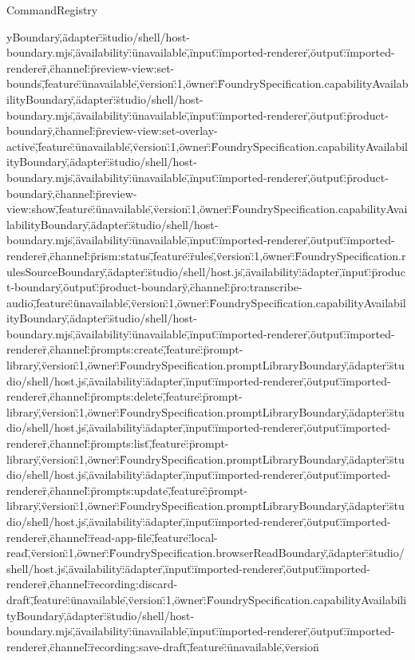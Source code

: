 \begin{lexlean}{CommandRegistry}
\begin{semanticmodule}
{yBoundary\",\"adapter\":\"studio/shell/host-boundary.mjs\",\"availability\":\"unavailable\",\"input\":\"imported-renderer\",\"output\":\"imported-renderer\"},{\"channel\":\"preview-view:set-bounds\",\"feature\":\"unavailable\",\"version\":1,\"owner\":\"FoundrySpecification.capabilityAvailabilityBoundary\",\"adapter\":\"studio/shell/host-boundary.mjs\",\"availability\":\"unavailable\",\"input\":\"imported-renderer\",\"output\":\"product-boundary\"},{\"channel\":\"preview-view:set-overlay-active\",\"feature\":\"unavailable\",\"version\":1,\"owner\":\"FoundrySpecification.capabilityAvailabilityBoundary\",\"adapter\":\"studio/shell/host-boundary.mjs\",\"availability\":\"unavailable\",\"input\":\"imported-renderer\",\"output\":\"product-boundary\"},{\"channel\":\"preview-view:show\",\"feature\":\"unavailable\",\"version\":1,\"owner\":\"FoundrySpecification.capabilityAvailabilityBoundary\",\"adapter\":\"studio/shell/host-boundary.mjs\",\"availability\":\"unavailable\",\"input\":\"imported-renderer\",\"output\":\"imported-renderer\"},{\"channel\":\"prism:status\",\"feature\":\"rules\",\"version\":1,\"owner\":\"FoundrySpecification.rulesSourceBoundary\",\"adapter\":\"studio/shell/host.js\",\"availability\":\"adapter\",\"input\":\"product-boundary\",\"output\":\"product-boundary\"},{\"channel\":\"pro:transcribe-audio\",\"feature\":\"unavailable\",\"version\":1,\"owner\":\"FoundrySpecification.capabilityAvailabilityBoundary\",\"adapter\":\"studio/shell/host-boundary.mjs\",\"availability\":\"unavailable\",\"input\":\"imported-renderer\",\"output\":\"imported-renderer\"},{\"channel\":\"prompts:create\",\"feature\":\"prompt-library\",\"version\":1,\"owner\":\"FoundrySpecification.promptLibraryBoundary\",\"adapter\":\"studio/shell/host.js\",\"availability\":\"adapter\",\"input\":\"imported-renderer\",\"output\":\"imported-renderer\"},{\"channel\":\"prompts:delete\",\"feature\":\"prompt-library\",\"version\":1,\"owner\":\"FoundrySpecification.promptLibraryBoundary\",\"adapter\":\"studio/shell/host.js\",\"availability\":\"adapter\",\"input\":\"imported-renderer\",\"output\":\"imported-renderer\"},{\"channel\":\"prompts:list\",\"feature\":\"prompt-library\",\"version\":1,\"owner\":\"FoundrySpecification.promptLibraryBoundary\",\"adapter\":\"studio/shell/host.js\",\"availability\":\"adapter\",\"input\":\"imported-renderer\",\"output\":\"imported-renderer\"},{\"channel\":\"prompts:update\",\"feature\":\"prompt-library\",\"version\":1,\"owner\":\"FoundrySpecification.promptLibraryBoundary\",\"adapter\":\"studio/shell/host.js\",\"availability\":\"adapter\",\"input\":\"imported-renderer\",\"output\":\"imported-renderer\"},{\"channel\":\"read-app-file\",\"feature\":\"local-read\",\"version\":1,\"owner\":\"FoundrySpecification.browserReadBoundary\",\"adapter\":\"studio/shell/host.js\",\"availability\":\"adapter\",\"input\":\"imported-renderer\",\"output\":\"imported-renderer\"},{\"channel\":\"recording:discard-draft\",\"feature\":\"unavailable\",\"version\":1,\"owner\":\"FoundrySpecification.capabilityAvailabilityBoundary\",\"adapter\":\"studio/shell/host-boundary.mjs\",\"availability\":\"unavailable\",\"input\":\"imported-renderer\",\"output\":\"imported-renderer\"},{\"channel\":\"recording:save-draft\",\"feature\":\"unavailable\",\"version\"}
\end{semanticmodule}
\end{lexlean}
